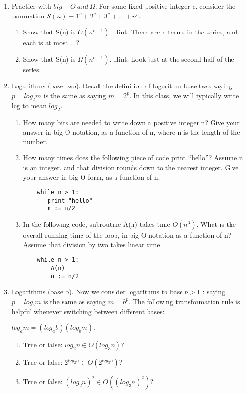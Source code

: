 \documentclass[12pt]{article}
\begin{document}
\begin{enumerate}
\item Practice with $big-O ~and ~\Omega$. For some fixed positive integer c, consider the summation
$S(n)=1^c +2^c +3^c + \dots +n^c.$
\begin{enumerate}
	\item Show that S(n) is $O(n^{c+1})$. Hint: There are n terms in the series, and each is at most ...?
    \item Show that S(n) is $ \Omega(n^{c+1})$. Hint: Look just at the second half of the series.
\end{enumerate}
\item Logarithms (base two). Recall the definition of logarithm base two: saying $p = log_2 m$ is the same as saying
$m = 2^p$. In this class, we will typically write log to mean $log_2$.
\begin{enumerate}
\item How many bits are needed to write down a positive integer n? Give your answer in big-O notation,
as a function of n, where n is the length of the number.
\item How many times does the following piece of code print “hello”? Assume n is an integer, and that
division rounds down to the nearest integer. Give your answer in big-O form, as a function of n.

\begin{verbatim}
    while n > 1:
       print "hello"
       n := n/2
\end{verbatim}

\item In the following code, subroutine A(n) takes time $O(n^3)$. What is the overall running time of the loop, in big-O notation as a function of n? Assume that division by two takes linear time.
\begin{verbatim}
    while n > 1: 
        A(n)
        n := n/2
\end{verbatim}
\end{enumerate}

\item Logarithms (base b). Now we consider logarithms to base $b > 1$ : saying $p = log_b m$ is the same as saying
$m = b^p.$ The following transformation rule is helpful whenever switching between different bases: 

$log_a m = (log_a b)(log_b m).$

\begin{enumerate}
\item True or false: $log_2 n \in O(log_3 n)$? 
\item True or false: $2^{log_2 n} \in O(2^{log_3 n})$?
\item True or false: $(log_2 n)^2 \in O((log_3 n)^2)$?
\end{enumerate}



\end{enumerate}
\end{document}
